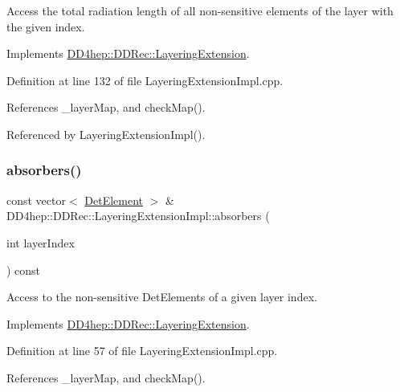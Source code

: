 Access the total radiation length of all non-\/sensitive elements of the layer with the given index. 



Implements \hyperlink{class_d_d4hep_1_1_d_d_rec_1_1_layering_extension_aca33441136624022aa7414895ba81fef}{D\+D4hep\+::\+D\+D\+Rec\+::\+Layering\+Extension}.



Definition at line 132 of file Layering\+Extension\+Impl.\+cpp.



References \+\_\+layer\+Map, and check\+Map().



Referenced by Layering\+Extension\+Impl().

\hypertarget{class_d_d4hep_1_1_d_d_rec_1_1_layering_extension_impl_a693de8a0ae4873d4d1a7abc7a6e2afce}{}\label{class_d_d4hep_1_1_d_d_rec_1_1_layering_extension_impl_a693de8a0ae4873d4d1a7abc7a6e2afce} 
\subsubsection{\texorpdfstring{absorbers()}{absorbers()}}
{\footnotesize\ttfamily const vector$<$ \hyperlink{class_d_d4hep_1_1_geometry_1_1_det_element}{Det\+Element} $>$ \& D\+D4hep\+::\+D\+D\+Rec\+::\+Layering\+Extension\+Impl\+::absorbers (\begin{DoxyParamCaption}\item[{int}]{layer\+Index }\end{DoxyParamCaption}) const\hspace{0.3cm}{\ttfamily [virtual]}}



Access to the non-\/sensitive Det\+Elements of a given layer index. 



Implements \hyperlink{class_d_d4hep_1_1_d_d_rec_1_1_layering_extension_a1204ac80c52fbca9ce3f71e2b3662eab}{D\+D4hep\+::\+D\+D\+Rec\+::\+Layering\+Extension}.



Definition at line 57 of file Layering\+Extension\+Impl.\+cpp.



References \+\_\+layer\+Map, and check\+Map().



